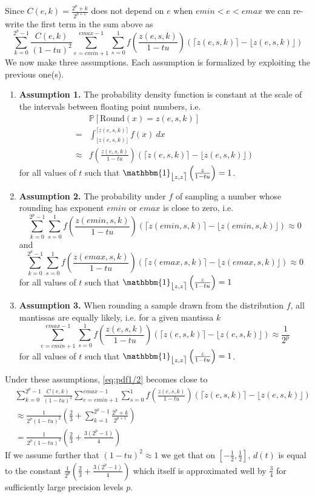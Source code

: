\documentclass[10pt,conference]{IEEEtran}
\newcommand{\Pro}[1]{\mathbb{P}\left[ #1 \right]}
\newcommand{\round}{\mathrm{Round}}
\newcommand{\ceil}[1]{\lceil #1 \rceil}
\newcommand{\floor}[1]{\lfloor #1 \rfloor}
\newcommand{\fintvl}[1][x]{\mathlarger{\lfloor}#1,#1\mathlarger{\rceil}}
\newcommand{\one}{\mathbbm{1}}
\begin{document}
\normalsize
Since $C(e,k)=\frac{2^p+k}{2^{p+1}}$ does not depend on $e$ when $emin<e<emax$ we can re-write the first term in the sum above as
\footnotesize
\[
\sum_{k=0}^{2^p-1}\frac{C(e,k)}{(1-tu)^2}\sum_{e=emin+1}^{emax-1}\sum_{s=0}^1 f\left(\frac{z(e,s,k)}{1-tu}\right)(\ceil{z(e,s,k)}-\floor{z(e,s,k)})
\]
\normalsize
We now make three assumptions. Each assumption is formalized by exploiting the previous one(s).

\begin{enumerate}
\item \textbf{Assumption 1.} The probability density function is constant at the scale of the intervals between floating point numbers, i.e.
\begin{align*}
&\Pro{\round(x)=z(e,s,k)}\\
=&\int_{\floor{z(e,s,k)}}^{\ceil{z(e,s,k)}} f(x)~dx \\
\approx & f\left(\frac{z(e,s,k)}{1-tu}\right)(\ceil{z(e,s,k)}-\floor{z(e,s,k)})
\end{align*}
for all values of $t$ such that $\one_{\fintvl[z]}\left(\frac{z}{1-tu}\right)=1$.
\item \textbf{Assumption 2.} The probability under $f$ of sampling a number whose rounding has exponent $emin$ or $emax$ is close to zero, i.e.
\footnotesize
\[
 \sum_{k=0}^{2^{p}-1}\sum_{s=0}^1 f\left(\frac{z(emin,s,k)}{1-tu}\right)(\ceil{z(emin,s,k)}-\floor{z(emin,s,k)})\approx 0
\]
\normalsize
and
\footnotesize
\[
 \sum_{k=0}^{2^{p}-1}\sum_{s=0}^1 f\left(\frac{z(emax,s,k)}{1-tu}\right)(\ceil{z(emax,s,k)}-\floor{z(emax,s,k)})\approx 0
\]
\normalsize
for all values of $t$ such that $\one_{\fintvl[z]}\left(\frac{z}{1-tu}\right)=1$
\item \textbf{Assumption 3.} When rounding a sample drawn from the distribution $f$, all mantissas are equally likely, i.e. for a given mantissa $k$
\footnotesize
\[
\sum_{e=emin+1}^{emax-1}\sum_{s=0}^1 f\left(\frac{z(e,s,k)}{1-tu}\right)(\ceil{z(e,s,k)}-\floor{z(e,s,k)})\approx \frac{1}{2^p}
\]
\normalsize
for all values of $t$ such that $\one_{\fintvl[z]}\left(\frac{z}{1-tu}\right)=1$.
\end{enumerate}

Under these assumptions, \eqref{eq:pdf1/2} becomes close to
\footnotesize
\begin{align}
&\sum_{k=0}^{2^p-1}\frac{C(e,k)}{(1-tu)^2}\sum_{e=emin+1}^{emax-1}\sum_{s=0}^1 f\left(\frac{z(e,s,k)}{1-tu}\right)(\ceil{z(e,s,k)}-\floor{z(e,s,k)})\nonumber
\\
&\approx\frac{1}{2^p(1-tu)^2}\left(\frac{2}{3}+\sum_{k=1}^{2^p-1}\frac{2^p+k}{2^{p+1}}\right)\nonumber
\\
&=\frac{1}{2^p(1-tu)^2}\left(\frac{2}{3}+\frac{3(2^{p}-1)}{4}\right)\label{eq:pdf1/2ass}
\end{align}
\normalsize
If we assume further that $(1-tu)^2\approx 1$ we get that on $\left[-\frac{1}{2},\frac{1}{2}\right]$, $d(t)$ is equal to the constant $\frac{1}{2^p}\left(\frac{2}{3}+\frac{3(2^{p}-1)}{4}\right)$ which itself is approximated well by $\frac{3}{4}$ for sufficiently large precision levels $p$.
\end{document}
